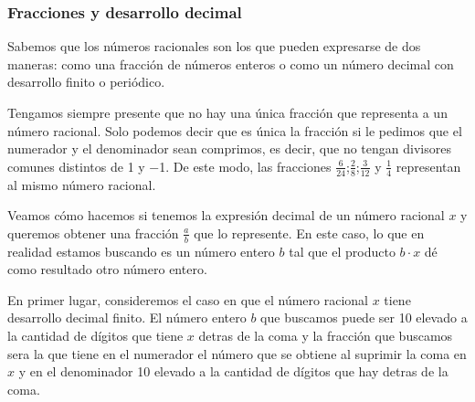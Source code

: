 \documentclass[../teoria.root.tex]{subfiles}
\begin{document}
\subsubsection{Fracciones y desarrollo decimal}
Sabemos que los números racionales son los que pueden expresarse de dos maneras:
como una fracción de números enteros o como un número decimal con desarrollo finito o periódico.

Tengamos siempre presente que no hay una única fracción que representa a un número racional.
Solo podemos decir que es única la fracción si le pedimos que el numerador y el denominador sean comprimos, es decir, que no tengan divisores comunes distintos de 1 y −1.
De este modo, las fracciones \(\frac{6}{24}\);\(\frac{2}{8}\);\(\frac{3}{12}\) y \(\frac{1}{4}\) representan al mismo número racional.

Veamos cómo hacemos si tenemos la expresión decimal de un número racional \(x\) y queremos obtener una fracción \(\frac{a}{b}\) que lo represente.
En este caso, lo que en realidad estamos buscando es un número entero \(b\) tal que el producto \(b \cdot x\) dé como resultado otro número entero.

En primer lugar, consideremos el caso en que el número racional \(x\) tiene desarrollo decimal finito.
El número entero \(b\) que buscamos puede ser 10 elevado a la cantidad de dígitos que tiene \(x\) detras de la coma y la fracción que buscamos sera la que tiene en el numerador el número que se obtiene al suprimir la coma en \(x\) y en el denominador 10 elevado a la cantidad de dígitos que hay detras de la coma.
\end{document}
